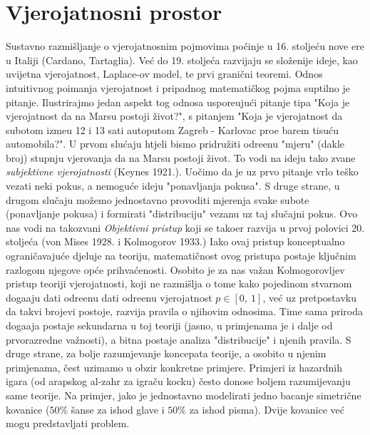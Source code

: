 

\chapter{Vjerojatnosni prostor}

Sustavno razmi\v sljanje o vjerojatnosnim pojmovima po\v cinje u 16. stolje\' cu nove ere u Italiji (Cardano, Tartaglia). Ve\' c do 19. stolje\' ca razvijaju se slo\v zenije ideje, kao uvijetna vjerojatnost, Laplace-ov model, te prvi grani\v cni teoremi. Odnos intuitivnog poimanja vjerojatnost i pripadnog matemati\v ckog pojma suptilno je pitanje.
Ilustrirajmo jedan aspekt tog odnosa uspore\dj uju\' ci pitanje tipa "Koja je vjerojatnost da na Marsu postoji \v zivot?", s pitanjem "Koja je vjerojatnost da subotom izme\dj u 12 i 13 sati autoputom Zagreb - Karlovac pro\dj e barem tisu\' cu automobila?".
U prvom slu\' caju htjeli bismo pridru\v ziti odre\dj enu "mjeru" (dakle broj) stupnju vjerovanja da na Marsu postoji \v zivot.
To vodi na ideju tako zvane \emph{subjektivne vjerojatnosti} (Keynes 1921.).
Uo\v cimo da je uz prvo pitanje vrlo te\v sko vezati neki pokus, a nemogu\' ce ideju "ponavljanja pokusa".
S druge strane, u drugom slu\v caju mo\v zemo jednostavno provoditi mjerenja svake subote (ponavljanje pokusa) i formirati "distribuciju" vezanu uz taj slu\v cajni pokus.
Ovo nas vodi na takozvani \emph{Objektivni pristup} koji se tako\dj er razvija u prvoj polovici 20. stolje\' ca (von Mises 1928. i Kolmogorov 1933.)
Iako ovaj pristup konceptualno ograni\v cavaju\' ce djeluje na teoriju, matemati\v cnost ovog pristupa postaje klju\v cnim razlogom njegove op\' ce prihva\' cenosti.
Osobito je za nas va\v zan Kolmogorovljev pristup teoriji vjerojatnosti, koji ne razmi\v slja o tome kako pojedinom stvarnom doga\dj aju dati odre\dj enu dati odre\dj enu vjerojatnost $p \in [0, \: 1]$, ve\' c uz pretpostavku da takvi brojevi postoje, razvija pravila o njihovim odnosima.
Time sama priroda doga\dj aja postaje sekundarna u toj teoriji (jasno, u primjenama je i dalje od prvorazredne va\v znosti), a bitna postaje analiza "distribucije" i njenih pravila.
S druge strane, za bolje razumjevanje koncepata teorije, a osobito u njenim primjenama, \v cest uzimamo u obzir konkretne primjere.
Primjeri iz hazardnih igara (od arapskog al-zahr za igra\v cu kocku) \v cesto donose boljem razumijevanju same teorije.
Na primjer, jako je jednostavno modelirati jedno bacanje simetri\v cne kovanice ($50\%$ \v sanse za ishod glave i $50\%$ za ishod pisma).
Dvije kovanice ve\' c mogu predstavljati problem.

